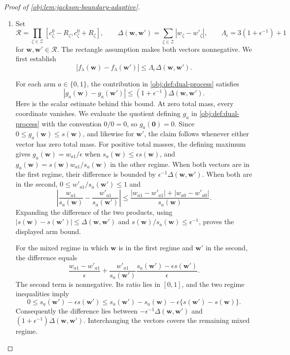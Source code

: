 \begin{proof}[Proof of \cref{obj:lem:jackson-boundary-adaptive}]
\begin{enumerate}
\item Set
\[
\mathcal R=\prod_{\zeta\in\mathcal Z}
[c^0_\zeta-R_\zeta,c^0_\zeta+R_\zeta],
\qquad
\Delta(\mathbf w,\mathbf w')
=\sum_{\zeta\in\mathcal Z}|w_\zeta-w'_\zeta|,
\qquad
\Lambda_\epsilon=3(1+\epsilon^{-1})+1
\]
for \(\mathbf w,\mathbf w'\in\mathcal R\). The rectangle assumption makes both vectors nonnegative. We first establish
\[
|f_\lambda(\mathbf w)-f_\lambda(\mathbf w')|
\leq\Lambda_\epsilon\Delta(\mathbf w,\mathbf w').
\]

For each arm \(a\in\{0,1\}\), the contribution in \cref{obj:def:dual-process} satisfies
\[
|g_a(\mathbf w)-g_a(\mathbf w')|
\leq(1+\epsilon^{-1})\Delta(\mathbf w,\mathbf w').
\]
Here is the scalar estimate behind this bound. At zero total mass, every coordinate vanishes. We evaluate the quotient defining \(g_a\) in \cref{obj:def:dual-process} with the convention \(0/0=0\), so \(g_a(\mathbf 0)=0\). Since \(0\leq g_a(\mathbf w)\leq s(\mathbf w)\), and likewise for \(\mathbf w'\), the claim follows whenever either vector has zero total mass. For positive total masses, the defining maximum gives \(g_a(\mathbf w)=w_{a1}/\epsilon\) when \(s_a(\mathbf w)\leq\epsilon s(\mathbf w)\), and \(g_a(\mathbf w)=s(\mathbf w)w_{a1}/s_a(\mathbf w)\) in the other regime. When both vectors are in the first regime, their difference is bounded by \(\epsilon^{-1}\Delta(\mathbf w,\mathbf w')\). When both are in the second, \(0\leq w'_{a1}/s_a(\mathbf w')\leq1\) and
\[
\left|
\frac{w_{a1}}{s_a(\mathbf w)}
-\frac{w'_{a1}}{s_a(\mathbf w')}
\right|
\leq
\frac{|w_{a1}-w'_{a1}|+|w_{a0}-w'_{a0}|}
{s_a(\mathbf w)}.
\]
Expanding the difference of the two products, using
\(|s(\mathbf w)-s(\mathbf w')|\leq\Delta(\mathbf w,\mathbf w')\) and
\(s(\mathbf w)/s_a(\mathbf w)\leq\epsilon^{-1}\), proves the displayed arm bound.

For the mixed regime in which \(\mathbf w\) is in the first regime and \(\mathbf w'\) in the second, the difference equals
\[
\frac{w_{a1}-w'_{a1}}{\epsilon}
+
\frac{w'_{a1}}{s_a(\mathbf w')}
\frac{s_a(\mathbf w')-\epsilon s(\mathbf w')}{\epsilon}.
\]
The second term is nonnegative. Its ratio lies in \([0,1]\), and the two regime inequalities imply
\[
0\leq s_a(\mathbf w')-\epsilon s(\mathbf w')
\leq s_a(\mathbf w')-s_a(\mathbf w)
       -\epsilon\{s(\mathbf w')-s(\mathbf w)\}.
\]
Consequently the difference lies between
\(-\epsilon^{-1}\Delta(\mathbf w,\mathbf w')\) and
\((1+\epsilon^{-1})\Delta(\mathbf w,\mathbf w')\).
Interchanging the vectors covers the remaining mixed regime.


\end{enumerate}
\end{proof}
